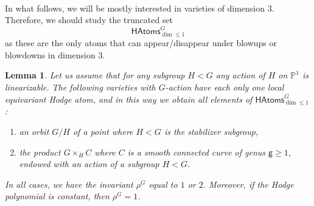 \documentclass[12pt,a4paper]{amsart}
\newtheorem{lemma}[theorem]{Lemma}
\theoremstyle{definition}
\theoremstyle{remark}
\newcommand{\Z}{\mathbb{Z}}
\begin{document}
\ 

\noindent{}

\

\  




In what follows, we will be mostly interested in varieties of dimension $3$. Therefore, we should study the truncated set 
\[
\mathsf{HAtoms}^{G}_{\dim \leq 1}
\]
as these are the only atoms that can appear/disappear under blowups or blowdowns in dimension $3$.
\medskip

\begin{lemma}\label{lem:atom-generators} Let us assume that for any subgroup $H<G$ any action of $H$ on $\mathbb P^1$ is linearizable.
The following varieties with $G$-action have each only one local equivariant Hodge atom, and in this way we obtain \textit{all} elements of \(\mathsf{HAtoms}^{G}_{\dim \leq 1}\):
\begin{enumerate}
    \item an orbit $G/H$ of a point where $H<G$ is the stabilizer subgroup,
    \item  the product $G\times_H C$ where $C$ is a smooth connected curve of genus $\mathsf g\ge 1$, endowed with an action of a subgroup $H<G$.
\end{enumerate}
In all cases, we have the invariant $\rho^G$ equal to $1$ or $2$. Moreover, if the Hodge polynomial is constant, then $\rho^G=1$.
\end{lemma}
\end{document}
